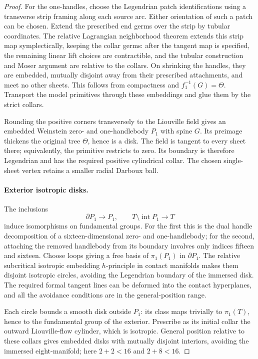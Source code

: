 \begin{proof}
For the one-handles, choose the Legendrian patch identifications
using a transverse strip framing along each source arc.  Either
orientation of such a patch can be chosen.  Extend the prescribed
end germs over the strip by tubular coordinates.  The relative
Lagrangian neighborhood theorem extends this strip map
symplectically, keeping the collar germs: after the tangent map is
specified, the remaining linear lift choices are contractible,
and the tubular construction and Moser argument are relative to
the collars.  On shrinking the handles, they are embedded,
mutually disjoint away from their prescribed attachments, and
meet no other sheets.  This follows from compactness and
$f_1^{-1}(G)=\Theta$.  Transport the model primitives through
these embeddings and glue them by the strict collars.

Rounding the positive corners transversely to the Liouville field
gives an embedded Weinstein zero- and one-handlebody $P_1$ with
spine $G$.  Its preimage thickens the original tree $\Theta$,
hence is a disk.  The field is tangent to every sheet there;
equivalently, the primitive restricts to zero.  Its boundary is
therefore Legendrian and has the required positive cylindrical
collar.  The chosen single-sheet vertex retains a smaller radial
Darboux ball.

\paragraph{Exterior isotropic disks.}
The inclusions
\[
 \partial P_1\longrightarrow P_1,
 \qquad T\setminus\operatorname{int}P_1\longrightarrow T
\]
induce isomorphisms on fundamental groups.  For the first this is
the dual handle decomposition of a sixteen-dimensional zero-
and one-handlebody; for the second, attaching the removed
handlebody from its boundary involves only indices fifteen and
sixteen.  Choose loops giving a free basis of $\pi_1(P_1)$ in
$\partial P_1$.  The relative subcritical isotropic embedding
$h$-principle in contact manifolds
\cite[Theorem~12.4.1]{gromov-flexibility}
makes them disjoint isotropic circles, avoiding the Legendrian
boundary of the immersed disk.  The required formal tangent
lines can be deformed into the contact hyperplanes, and all the
avoidance conditions are in the general-position range.

Each circle bounds a smooth disk outside $P_1$: its class maps
trivially to $\pi_1(T)$, hence to the fundamental group of the
exterior.  Prescribe as its initial collar the outward
Liouville-flow cylinder, which is isotropic.  General position
relative to these collars gives embedded disks with mutually
disjoint interiors, avoiding the immersed eight-manifold; here
$2+2<16$ and $2+8<16$.


\end{proof}

